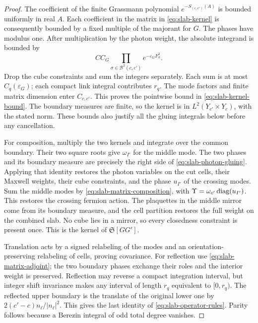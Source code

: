 \begin{proof}
The coefficient of the finite Grassmann polynomial
$e^{-S_{(c,c')}(A)}$ is bounded uniformly in real $A$. Each coefficient
in the matrix in \eqref{eq:slab-kernel} is consequently bounded by a
fixed multiple of the majorant for $G$. The phases have modulus one.
After multiplication by the photon weight, the absolute integrand is
bounded by
\[
 C C_G\prod_{\sigma\in\mathcal B^2(c,c')}
                           e^{-\varepsilon_GF_\sigma^2}.
\]
Drop the cube constraints and sum the integers separately. Each sum
is at most $C_q(\varepsilon_G)$; each compact link integral contributes
$r_q$. The mode factors and finite matrix dimension enter $C_{c,c'}$.
This proves the pointwise bound in \eqref{eq:slab-kernel-bound}.
The boundary measures are finite, so the kernel is in
$L^2(Y_{c'}\times Y_c)$, with the stated norm. These bounds also
justify all the gluing integrals below before any cancellation.

For composition, multiply the two kernels and integrate over the common
boundary. Their two square roots give $\omega_{I'}$ for the middle
mode. The two phases and its boundary measure are precisely the right
side of \eqref{eq:slab-photon-gluing}. Applying that identity restores
the photon variables on the cut cells, their Maxwell weights, their
cube constraints, and the phase $u_{I'}$ of the crossing modes. Sum
the middle modes by \eqref{eq:slab-matrix-composition}, with
$\Upsilon=\omega_{c'}\operatorname{diag}(u_{I'})$. This restores the crossing
fermion action. The plaquettes in the middle mirror come from its
boundary measure, and the cell partition restores the full weight on
the combined slab. No cube lies in a mirror, so every closedness
constraint is present once. This is the kernel of $\mathfrak S[GG']$.

Translation acts by a signed relabeling of the modes and an
orientation-preserving relabeling of cells, proving covariance.
For reflection use \eqref{eq:slab-matrix-adjoint}; the two boundary
phases exchange their roles and the interior weight is preserved.
Reflection may reverse a compact integration interval, but integer
shift invariance makes any interval of length $r_q$ equivalent to
$[0,r_q)$. The reflected upper boundary is the translate of the
original lower one by $2(c'-c)n_\ell/|n_\ell|^2$. This gives the last
identity of \eqref{eq:slab-operator-rules}. Parity follows because a
Berezin integral of odd total degree vanishes.


\end{proof}
